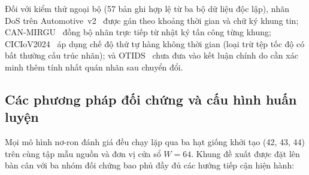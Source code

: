 \documentclass[12pt, a4paper, reqno, oneside]{book}
\begin{document}
Đối với kiểm thử ngoại bộ (57 bản ghi hợp lệ từ ba bộ dữ liệu độc lập), nhãn DoS trên Automotive~v2~\cite{dupont2019automotive} được gán theo khoảng thời gian và chữ ký khung tin; CAN-MIRGU~\cite{rajapaksha2024canmirgu} đồng bộ nhãn trực tiếp từ nhật ký tấn công từng khung; CICIoV2024~\cite{neto2024ciciov2024} áp dụng chế độ thứ tự hàng không thời gian (loại trừ tệp tốc độ có bất thường cấu trúc nhãn); và OTIDS~\cite{lee2017otids} chưa đưa vào kết luận chính do cần xác minh thêm tính nhất quán nhãn sau chuyển đổi.

\subsection{Các phương pháp đối chứng và cấu hình huấn luyện}\label{subsec:exp-baselines}\label{sec:comparison-protocol}

Mọi mô hình nơ-ron đánh giá đều chạy lặp qua ba hạt giống khởi tạo (42, 43, 44) trên cùng tập mẫu nguồn và đơn vị cửa sổ $W=64$. Khung đề xuất được đặt lên bàn cân với ba nhóm đối chứng bao phủ đầy đủ các hướng tiếp cận hiện hành:
\end{document}
